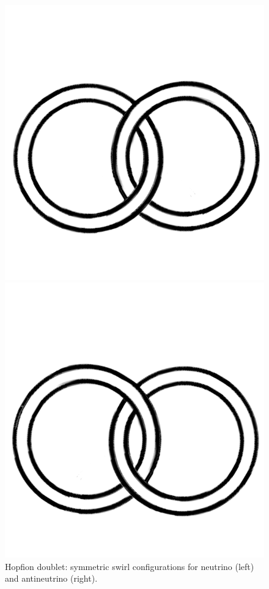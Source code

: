 \begin{figure}[H]
\centering
\begin{minipage}{0.45\textwidth}
    \centering
        \includegraphics[width=\textwidth]{images/hopf}
\end{minipage}
\hfill
\begin{minipage}{0.45\textwidth}
    \centering
        \includegraphics[width=\textwidth]{images/ahopf}
\end{minipage}
      \caption{Hopfion doublet: symmetric swirl configurations for neutrino (left) and antineutrino (right).}
\end{figure}


